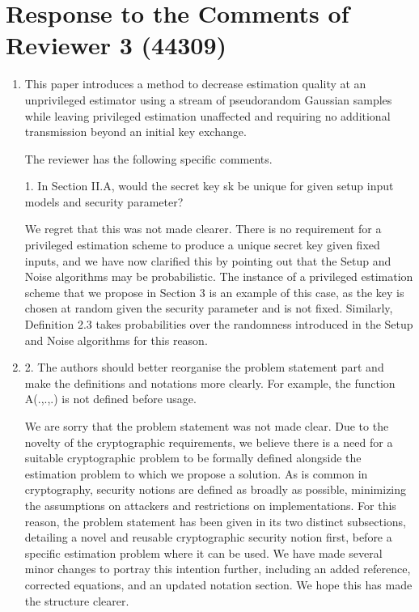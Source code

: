 \documentclass[a4paper]{scrartcl}
\newenvironment{rebuttal}{\begin{enumerate}[label={\color{grey}\thesection.\arabic{enumi}},leftmargin=0pt,ref=\thesection.\arabic{enumi}]}{\end{enumerate}}
\newcommand{\reviewtext}[1]{{\color{nblue} #1}}
\begin{document}
\section*{Response to the Comments of Reviewer 3 (44309)}
\def\thesection{R3}
\begin{rebuttal}
\item \reviewtext{This paper introduces a method to decrease estimation quality at an unprivileged estimator using a stream of pseudorandom Gaussian samples while leaving privileged estimation unaffected and requiring no additional transmission beyond an initial key exchange.

The reviewer has the following specific comments.

1. In Section II.A, would the secret key sk be unique for given setup input models and security parameter?}

We regret that this was not made clearer. There is no requirement for a privileged estimation scheme to produce a unique secret key given fixed inputs, and we have now clarified this by pointing out that the Setup and Noise algorithms may be probabilistic. The instance of a privileged estimation scheme that we propose in Section 3 is an example of this case, as the key is chosen at random given the security parameter and is not fixed. Similarly, Definition 2.3 takes probabilities over the randomness introduced in the Setup and Noise algorithms for this reason.

\item \reviewtext{2. The authors should better reorganise the problem statement part and make the definitions and notations more clearly. For example, the function A(.,.,.) is not defined before usage.}

We are sorry that the problem statement was not made clear. Due to the novelty of the cryptographic requirements, we believe there is a need for a suitable cryptographic problem to be formally defined alongside the estimation problem to which we propose a solution. As is common in cryptography, security notions are defined as broadly as possible, minimizing the assumptions on attackers and restrictions on implementations. For this reason, the problem statement has been given in its two distinct subsections, detailing a novel and reusable cryptographic security notion first, before a specific estimation problem where it can be used. We have made several minor changes to portray this intention further, including an added reference, corrected equations, and an updated notation section. We hope this has made the structure clearer.


\end{rebuttal}
\end{document}
